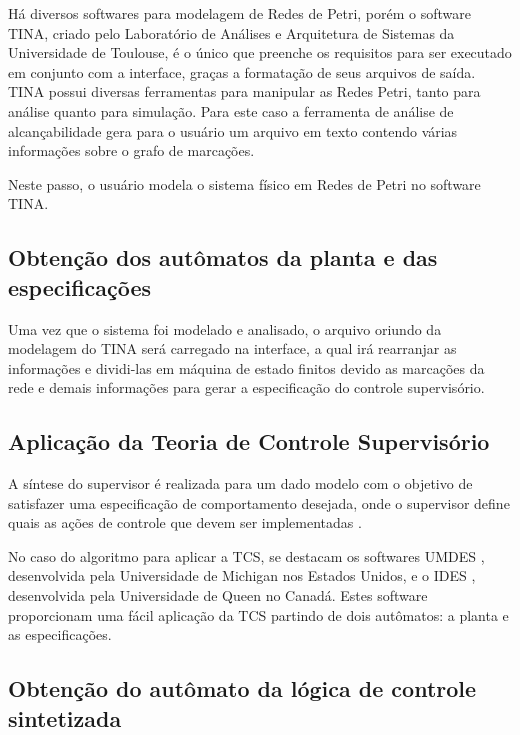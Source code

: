 H\'a diversos softwares para modelagem de Redes de Petri, por\'em o software TINA, criado pelo Laborat\'orio de An\'alises e Arquitetura de Sistemas da Universidade de Toulouse, \'e o \'unico que preenche os requisitos para ser executado em conjunto com a interface, gra\c{c}as a formata\c{c}\~ao de seus arquivos de sa\'ida. TINA possui diversas ferramentas para manipular as Redes Petri, tanto para an\'alise quanto para simula\c{c}\~ao. Para este caso a ferramenta de an\'alise de alcan\c{c}abilidade gera para o usu\'ario um arquivo em texto contendo v\'arias informa\c{c}\~oes sobre o grafo de marca\c{c}\~oes.

Neste passo, o usu\'ario modela o sistema f\'isico em Redes de Petri no software TINA.

\subsection{Obten\c{c}\~ao dos aut\^omatos da planta e das especifica\c{c}\~oes}

Uma vez que o sistema foi modelado e analisado, o arquivo oriundo da modelagem do TINA ser\'a carregado na interface, a qual ir\'a rearranjar as informa\c{c}\~oes e dividi-las em m\'aquina de estado finitos devido as marca\c{c}\~oes da rede e demais informa\c{c}\~oes para gerar a especifica\c{c}\~ao do controle supervis\'orio.


\subsection{Aplica\c{c}\~ao da Teoria de Controle Supervis\'orio}

A s\'intese do supervisor \'e realizada para um dado modelo com o objetivo de satisfazer uma especifica\c{c}\~ao de comportamento desejada, onde o supervisor define quais as a\c{c}\~oes de controle que devem ser implementadas \cite{Montgomery2004}.

No caso do algoritmo para aplicar a TCS, se destacam os softwares UMDES \cite{umdes}, desenvolvida pela Universidade de Michigan nos Estados Unidos, e o IDES \cite{ides}, desenvolvida pela Universidade de Queen no Canad\'a. Estes software proporcionam uma f\'acil aplica\c{c}\~ao da TCS partindo de dois aut\^omatos: a planta e as especifica\c{c}\~oes.

\subsection{Obten\c{c}\~ao do aut\^omato da l\'ogica de controle sintetizada}

